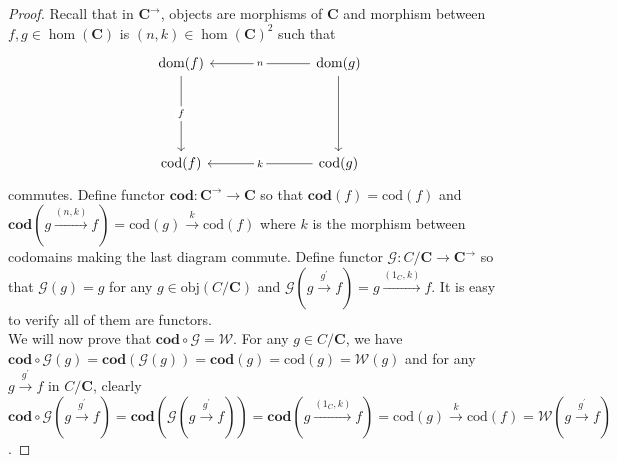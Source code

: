 \documentclass[a4paper, 11pt]{book}
\theoremstyle{plain}
\theoremstyle{plain}
\newcommand{\mb}{\mathbf}
\newcommand{\arr}{\rightarrow}
\newcommand{\p}{\prime}
\newcommand{\obj}{\text{obj}}
\newcommand{\mc}{\mathcal}
\newcommand{\warr}{\xrightarrow}
\newcommand{\C}{\mathbf{C}}
\newcommand{\cod}{\text{cod}}
\begin{document}
\begin{proof}
    Recall that in $\mb{C}^\arr$, objects are morphisms of $\C$ and morphism between $f,g \in \hom(\C)$ is $(n,k) \in \hom(\C)^2$ such that 
    \[\begin{tikzcd}
      { \text{dom}(f)} &&& { \text{dom}(g)} \\
      \\
      \\
      { \text{cod}(f)} &&& { \text{cod}(g)}
      \arrow["{n}"{description}, from=1-4, to=1-1]
      \arrow["f"{description}, from=1-1, to=4-1]
      \arrow["{k}"{description}, from=4-4, to=4-1]
      \arrow[from=1-4, to=4-4]
    \end{tikzcd}\]
    commutes. Define functor $\mb{cod}: \mb{C}^\arr \arr \mb{C}$ so that $\mb{cod}(f)=\cod(f)$ and $\mb{cod}(g \warr{(n, k)} f)=\cod(g) \warr{k} \cod(f)$ where $k$ is the morphism between codomains making the last diagram commute. Define functor $\mc{G}: C/\mb{C} \arr \mb{C}^\arr$ so that $\mc{G}(g)=g$ for any $g \in \obj(C/\mb{C})$ and $\mc{G}(g \warr{g^\p} f)=g \warr{( 1_C, k)} f$. It is easy to verify all of them are functors. \\

    We will now prove that $\mb{cod} \circ \mc{G}=\mc{W}$. For any $g \in C/\mb{C}$, we have $\mb{cod} \circ \mc{G}(g)=\mb{cod} ( \mc{G}(g))=\mb{cod}(g)=\cod(g)=\mc{W}(g)$ and for any $g \warr{g^\p} f$ in $C/\mb{C}$, clearly $\mb{cod} \circ \mc{G} (g \warr{g^\p} f )=\mb{cod}( \mc{G} (g \warr{g^\p} f ))=\mb{cod}(g \warr{(1_C, k)} f)=\cod(g) \warr{k} \cod(f)=\mc{W}(g \warr{g^\p} f)$.
  \end{proof}
\end{document}
